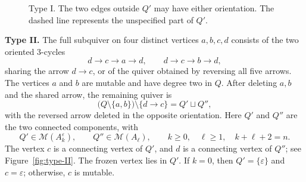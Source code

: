 \documentclass[a4paper, 12pt, reqno]{amsart}
\theoremstyle{definition}
\begin{document}
\begin{figure}[htbp]
\centering
{}
\caption{Type I. The two edges outside $Q'$ may have either orientation. The dashed line represents the unspecified part of $Q'$.} \label{fig:type-I}
\end{figure}

\medskip
\noindent\textbf{Type II.}
The full subquiver on four distinct vertices $a,b,c,d$ consists of the two oriented $3$-cycles
\[
d\longrightarrow c\longrightarrow a\longrightarrow d, \qquad d\longrightarrow c\longrightarrow b\longrightarrow d,
\]
sharing the arrow $d\longrightarrow c$, or of the quiver obtained by reversing all five arrows. The vertices $a$ and $b$ are mutable and have degree two in $Q$. After deleting $a,b$ and the shared arrow, the remaining quiver is
\[
\bigl(Q\setminus\{a,b\}\bigr) \setminus\{d\longrightarrow c\}=Q'\sqcup Q'',
\]
with the reversed arrow deleted in the opposite orientation. Here $Q'$ and $Q''$ are the two connected components, with
\[
Q'\in\mathcal{M}(A_k^\varepsilon), \qquad Q''\in\mathcal{M}(A_\ell), \qquad
k\geq0,\quad \ell\geq1,\quad k+\ell+2=n.
\]
The vertex $c$ is a connecting vertex of $Q'$, and $d$ is a connecting vertex of $Q''$; see Figure~\ref{fig:type-II}. The frozen vertex lies in $Q'$. If $k=0$, then $Q'=\{\varepsilon\}$ and $c=\varepsilon$; otherwise, $c$ is mutable.
\end{document}
